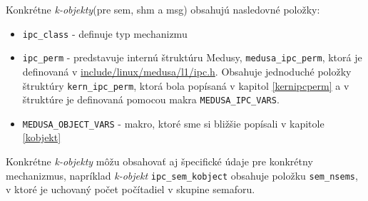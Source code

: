 Konkrétne \textit{k-objekty}(pre \acrshort{sem}, \acrshort{shm} a \acrshort{msg}) obsahujú nasledovné položky:
\begin{itemize}
\item \texttt{ipc\_class} - definuje typ mechanizmu
\item \texttt{ipc\_perm} - predstavuje internú štruktúru Medusy, \texttt{medusa\_ipc\_perm}, ktorá je definovaná v \url{include/linux/medusa/l1/ipc.h}. Obsahuje jednoduché položky štruktúry \texttt{kern\_ipc\_perm}, ktorá bola popísaná v kapitol \ref{kernipcperm} a v štruktúre je definovaná pomocou makra \texttt{MEDUSA\_IPC\_VARS}.
\item \texttt{MEDUSA\_OBJECT\_VARS} - makro, ktoré sme si bližšie popísali v kapitole \ref{kobjekt}
\end{itemize}
Konkrétne \textit{k-objekty} môžu obsahovať aj špecifické údaje pre konkrétny mechanizmus, napríklad \textit{k-objekt} \texttt{ipc\_sem\_kobject} obsahuje položku \texttt{sem\_nsems}, v ktoré je uchovaný počet počítadiel v skupine semaforu.
